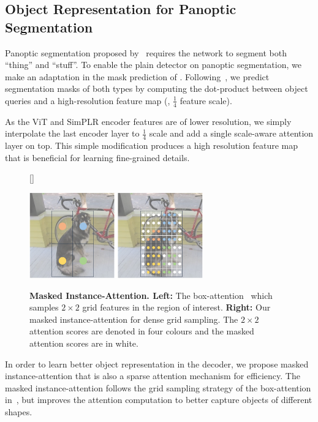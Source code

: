 \subsection{Object Representation for Panoptic Segmentation} 

Panoptic segmentation proposed by~\cite{kirillov2019panoptic} requires the network to segment both ``thing'' and ``stuff''. To enable the plain detector on panoptic segmentation, we make an adaptation in the mask prediction of \ours. Following~\cite{cheng2022mask2former}, we predict segmentation masks of both types by computing the dot-product between object queries and a high-resolution feature map (\ie, $\frac{1}{4}$ feature scale).

As the ViT and SimPLR encoder features are of lower resolution, we simply interpolate the last encoder layer to $\frac{1}{4}$ scale and add a single scale-aware attention layer on top. This simple modification produces a high resolution feature map that is beneficial for learning fine-grained details.

\begin{figure}[t]
[\FBwidth]
{\caption{
    \textbf{Masked Instance-Attention. Left:} The box-attention~\cite{nguyen2022boxer} which samples $2\times2$ grid features in the region of interest. \textbf{Right:} Our masked instance-attention for dense grid sampling. The $2\times2$ attention scores are denoted in four colours and the masked attention scores are in white.}
    \label{fig:masked_instance_attn}}%
{
\includegraphics[width=7.5cm]{fig/attn_comp.png}
}
\end{figure}

 In order to learn better object representation in the decoder, we propose masked instance-attention that is also a sparse attention mechanism for efficiency. The masked instance-attention follows the grid sampling strategy of the box-attention in~\cite{nguyen2022boxer}, but improves the attention computation to better capture objects of
different shapes.


